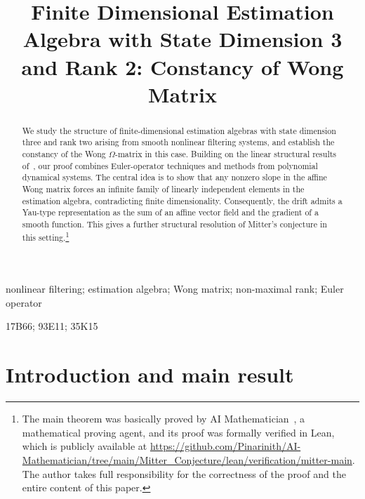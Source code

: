 \documentclass{tCON2e}
\title{Finite Dimensional Estimation Algebra with State Dimension 3 and Rank 2: Constancy of Wong Matrix}
\author{\name{Songlin Zhou}}
\newenvironment{revision}{\begingroup\color{black}}{\endgroup}
\numberwithin{equation}{section}
\theoremstyle{journalplain}
\theoremstyle{journaldef}
\newenvironment{revision}{}{}
\begin{document}
\maketitle
\begin{revision}
\begin{abstract}
We study the structure of finite-dimensional estimation algebras with state dimension three and rank two arising from smooth nonlinear
filtering systems, and establish the constancy of the Wong $\Omega$-matrix in this case.
Building on the linear structural results of~\citep{Shi2017Finite}, our proof combines Euler-operator techniques and methods from polynomial dynamical systems. The central idea is to show that any nonzero
slope in the affine Wong matrix forces an infinite family of linearly
independent elements in the estimation algebra, contradicting finite
dimensionality. Consequently, the drift admits a Yau-type representation
as the sum of an affine vector field and the gradient of a smooth
function. This gives a further structural resolution of Mitter's conjecture in this setting.\footnote{The main theorem was basically proved by AI Mathematician~\citep{liu2026aim}, a mathematical proving agent,
and its proof was formally verified in Lean, which is publicly
available at \url{https://github.com/Pinarinith/AI-Mathematician/tree/main/Mitter_Conjecture/lean/verification/mitter-main}. The author takes full responsibility for
the correctness of the proof and the entire content of this paper.}
\end{abstract}

\begin{keywords}
nonlinear filtering; estimation algebra; Wong matrix; non-maximal rank;
Euler operator
\end{keywords}
\begin{classcode}
17B66; 93E11; 35K15
\end{classcode}

\section{Introduction and main result}


\end{revision}
\end{document}
